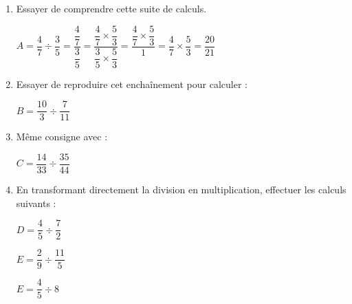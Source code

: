 \documentclass[a4paper]{book}
\begin{document}
    \begin{exercice}
        \begin{enumerate}[leftmargin=*]
            \item Essayer de comprendre cette suite de calculs.

            $A=\dfrac{4}{7}\div\dfrac{3}{5}
            =\dfrac{\dfrac{4}{7}}{\dfrac{3}{5}}
            =\dfrac{\dfrac{4}{7}\times\dfrac{5}{3}}{\dfrac{3}{5}\times\dfrac{5}{3}}
            =\dfrac{\dfrac{4}{7}\times\dfrac{5}{3}}{1}
            =\dfrac{4}{7}\times\dfrac{5}{3}
            =\dfrac{20}{21}$

            \item Essayer de reproduire cet enchaînement pour calculer : 

            \bigskip

            $B=\dfrac{10}{3}\div\dfrac{7}{11}$

            \bigskip

            \item Même consigne avec :

            \bigskip

            $C=\dfrac{14}{33}\div\dfrac{35}{44}$

            \bigskip

            \item En transformant directement la division en multiplication, effectuer les calculs suivants :

                    \medskip
        
            \begin{minipage}{0.30\linewidth}
                $D=\dfrac{4}{5}\div\dfrac{7}{2}$
            \end{minipage}
            \hfill\vline\hfill
            \begin{minipage}{0.30\linewidth}
                $E=\dfrac{2}{9}\div\dfrac{11}{5}$
            \end{minipage}
            \hfill\vline\hfill
            \begin{minipage}{0.30\linewidth}
                $E=\dfrac{4}{5}\div8$
            \end{minipage}
        \end{enumerate}
    \end{exercice}

    
\end{document}
